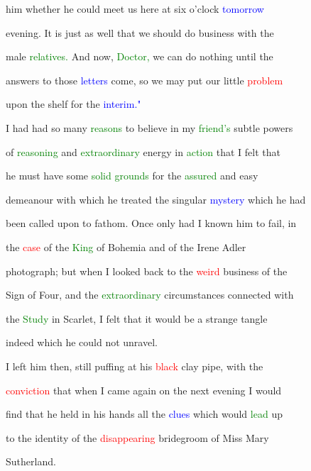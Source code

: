  him whether he could meet us here at six o'clock \textcolor{blue}{tomorrow}

 evening. It is just as well that we should do business with the

 male \textcolor{green}{relatives.} And now, \textcolor{green}{Doctor,} we can do nothing until the

 answers to those \textcolor{blue}{letters} come, so we may put our little \textcolor{red}{problem}

 upon the shelf for the \textcolor{blue}{interim."}



 I had had so many \textcolor{green}{reasons} to believe in my \textcolor{green}{friend's} subtle powers

 of \textcolor{green}{reasoning} and \textcolor{green}{extraordinary} energy in \textcolor{green}{action} that I felt that

 he must have some \textcolor{green}{solid} \textcolor{green}{grounds} for the \textcolor{green}{assured} and easy

 demeanour with which he \textcolor{BurntOrange}{treated} the singular \textcolor{blue}{mystery} which he had

 been called upon to fathom. Once only had I known him to fail, in

 the \textcolor{red}{case} of the \textcolor{green}{King} of Bohemia and of the Irene Adler

 photograph; but when I looked back to the \textcolor{red}{weird} business of the

 Sign of Four, and the \textcolor{green}{extraordinary} circumstances connected with

 the \textcolor{green}{Study} in Scarlet, I felt that it would be a strange tangle

 indeed which he could not unravel.



 I left him then, still puffing at his \textcolor{red}{black} clay pipe, with the

 \textcolor{red}{conviction} that when I came again on the next evening I would

 find that he held in his hands all the \textcolor{blue}{clues} which would \textcolor{green}{lead} up

 to the identity of the \textcolor{red}{disappearing} \textcolor{BurntOrange}{bridegroom} of Miss Mary

 Sutherland.



